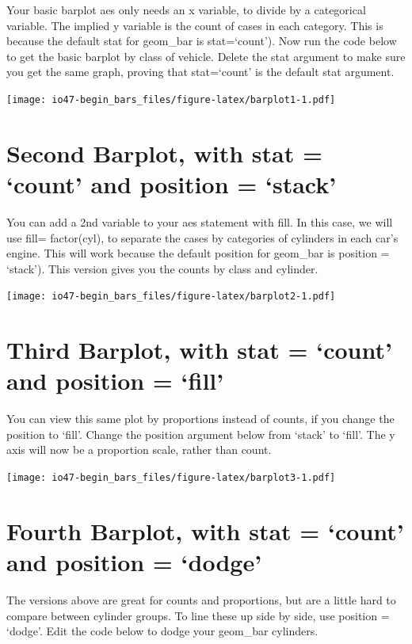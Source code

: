 \documentclass[
]{book}
\begin{document}
Your basic barplot aes only needs an x variable, to divide by a categorical variable. The implied y variable is the count of cases in each category. This is because the default stat for geom\_bar is stat=`count').
Now run the code below to get the basic barplot by class of vehicle.
Delete the stat argument to make sure you get the same graph, proving that stat=`count' is the default stat argument.

\texttt{[image: io47-begin\_bars\_files/figure-latex/barplot1-1.pdf]}

\hypertarget{second-barplot-with-stat-count-and-position-stack}{%
\section{Second Barplot, with stat = `count' and position = `stack'}\label{second-barplot-with-stat-count-and-position-stack}}

You can add a 2nd variable to your aes statement with fill. In this case, we will use fill= factor(cyl), to separate the cases by categories of cylinders in each car's engine. This will work because the default position for geom\_bar is position = `stack').
This version gives you the counts by class and cylinder.

\texttt{[image: io47-begin\_bars\_files/figure-latex/barplot2-1.pdf]}

\hypertarget{third-barplot-with-stat-count-and-position-fill}{%
\section{Third Barplot, with stat = `count' and position = `fill'}\label{third-barplot-with-stat-count-and-position-fill}}

You can view this same plot by proportions instead of counts, if you change the position to `fill'. Change the position argument below from `stack' to `fill'. The y axis will now be a proportion scale, rather than count.

\texttt{[image: io47-begin\_bars\_files/figure-latex/barplot3-1.pdf]}

\hypertarget{fourth-barplot-with-stat-count-and-position-dodge}{%
\section{Fourth Barplot, with stat = `count' and position = `dodge'}\label{fourth-barplot-with-stat-count-and-position-dodge}}

The versions above are great for counts and proportions, but are a little hard to compare between cylinder groups. To line these up side by side, use position = `dodge'. Edit the code below to dodge your geom\_bar cylinders.
\end{document}
